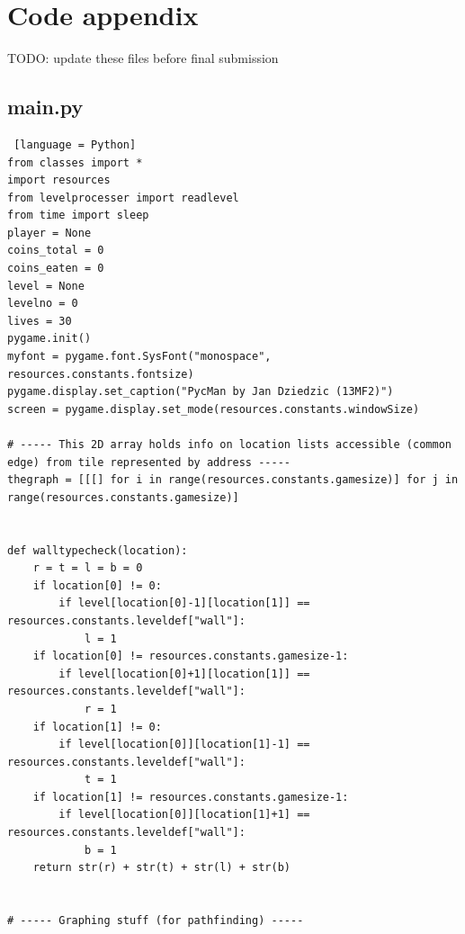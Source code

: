 \documentclass[11pt,a4paper]{report}
\begin{document}
	\chapter{Code appendix}
	TODO: update these files before final submission
		\section{main.py}
			\begin{lstlisting} [language = Python]
from classes import *
import resources
from levelprocesser import readlevel
from time import sleep
player = None
coins_total = 0
coins_eaten = 0
level = None
levelno = 0
lives = 30
pygame.init()
myfont = pygame.font.SysFont("monospace", resources.constants.fontsize)
pygame.display.set_caption("PycMan by Jan Dziedzic (13MF2)")
screen = pygame.display.set_mode(resources.constants.windowSize)

# ----- This 2D array holds info on location lists accessible (common edge) from tile represented by address -----
thegraph = [[[] for i in range(resources.constants.gamesize)] for j in range(resources.constants.gamesize)]


def walltypecheck(location):
	r = t = l = b = 0
	if location[0] != 0:
		if level[location[0]-1][location[1]] == resources.constants.leveldef["wall"]:
			l = 1
	if location[0] != resources.constants.gamesize-1:
		if level[location[0]+1][location[1]] == resources.constants.leveldef["wall"]:
			r = 1
	if location[1] != 0:
		if level[location[0]][location[1]-1] == resources.constants.leveldef["wall"]:
			t = 1
	if location[1] != resources.constants.gamesize-1:
		if level[location[0]][location[1]+1] == resources.constants.leveldef["wall"]:
			b = 1
	return str(r) + str(t) + str(l) + str(b)


# ----- Graphing stuff (for pathfinding) -----



\end{lstlisting}
\end{document}
